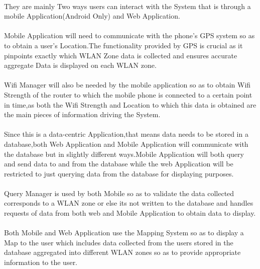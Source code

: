 \paragraph{}They are mainly Two ways users can interact with the System that is through a mobile Application(Android Only) and Web Application.

\paragraph{}Mobile Application will need to communicate with the phone's GPS system so as to obtain a user's Location.The functionality provided by GPS is crucial as it pinpoints exactly which WLAN Zone data is collected and ensures accurate aggregate Data is displayed on each WLAN zone.

\paragraph{}Wifi Manager will also be needed by the mobile application so as to obtain Wifi Strength of the router to which the mobile phone is connected to a certain point in time,as both the Wifi Strength and Location to which this data is obtained are the main pieces of information driving the System.

\paragraph{}Since this is a data-centric Application,that means data needs to be stored in a database,both Web Application and Mobile Application will communicate with the database but in slightly different ways.Mobile Application will both query and send data to and from the database while
the web Application will be restricted to just querying data from the database for displaying purposes.

\paragraph{}Query Manager is used by both Mobile so as to validate the data collected corresponds to a WLAN zone or else its not written to the database and handles requests of data from both web and Mobile Application to obtain data to display.

\paragraph{}Both Mobile and Web Application use the Mapping System so as to display a Map to the user which includes data collected from the users stored in the database aggregated into different WLAN zones so as to provide appropriate information to the user.

